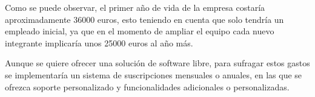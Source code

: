 Como se puede observar, el primer año de vida de la empresa costaría aproximadamente 36000 euros, esto teniendo en cuenta que solo tendría un empleado inicial, ya que en el momento de ampliar el equipo cada nuevo integrante implicaría unos 25000 euros al año más.

Aunque se quiere ofrecer una solución de software libre, para sufragar estos gastos se implementaría un sistema de suscripciones mensuales o anuales, en las que se ofrezca soporte personalizado y funcionalidades adicionales o personalizadas.